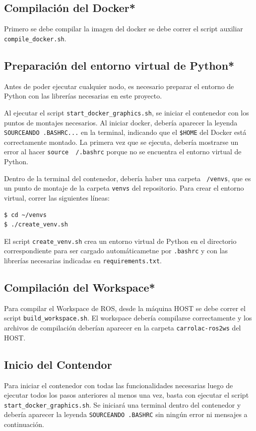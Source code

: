 \documentclass[12pt, a4paper]{report}
\begin{document}
			\subsection{Compilación del Docker*}\label{subsec:compilacion-del-docker*}
	Primero se debe compilar la imagen del docker se debe correr el script auxiliar \texttt{compile\_docker.sh}.
			\subsection{Preparación del entorno virtual de Python*}\label{subsec:preparacion-del-entorno-virtual-de-python}
	Antes de poder ejecutar cualquier nodo, es necesario preparar el entorno de Python con las librerías necesarias en este proyecto.

				Al ejecutar el script \texttt{start\_docker\_graphics.sh}, se iniciar el contenedor con los puntos de montajes necesarios.
				Al iniciar docker, debería aparecer la leyenda \texttt{SOURCEANDO .BASHRC...} en la terminal, indicando que el \texttt{\$HOME} del Docker está correctamente montado.
				La primera vez que se ejecuta, debería mostrarse un error al hacer \texttt{source ~/.bashrc} porque no se encuentra el entorno virtual de Python.

				Dentro de la terminal del contenedor, debería haber una carpeta \texttt{~/venvs}, que es un punto de montaje de la carpeta \texttt{venvs} del repositorio.
				Para crear el entorno virtual, correr las siguientes líneas:
				\begin{lstlisting}[language=Bash, label={lst:create_venv}]
$ cd ~/venvs
$ ./create_venv.sh
				\end{lstlisting}
				El script \texttt{create\_venv.sh} crea un entorno virtual de Python en el directorio correspondiente para ser cargado automáticametne por \texttt{.bashrc} y con las librerías necesarias indicadas en \texttt{requirements.txt}.

			\subsection{Compilación del Workspace*}\label{subsec:compilacion-del-workspace*}
				Para compilar el Workspace de ROS, desde la máquina HOST se debe correr el script \texttt{build\_workspace.sh}.
				El workspace debería compilarse correctamente y los archivos de compilación deberían aparecer en la carpeta \texttt{carrolac-ros2ws} del HOST.

			\subsection{Inicio del Contendor}\label{subsec:inicio-del-contendor}
	Para iniciar el contenedor con todas las funcionalidades necesarias luego de ejecutar todos los pasos anteriores al menos una vez, basta con ejecutar el script \texttt{start\_docker\_graphics.sh}.
				Se iniciará una terminal dentro del contenedor y debería aparecer la leyenda \texttt{SOURCEANDO .BASHRC} sin ningún error ni mensajes a continuación.
\end{document}
